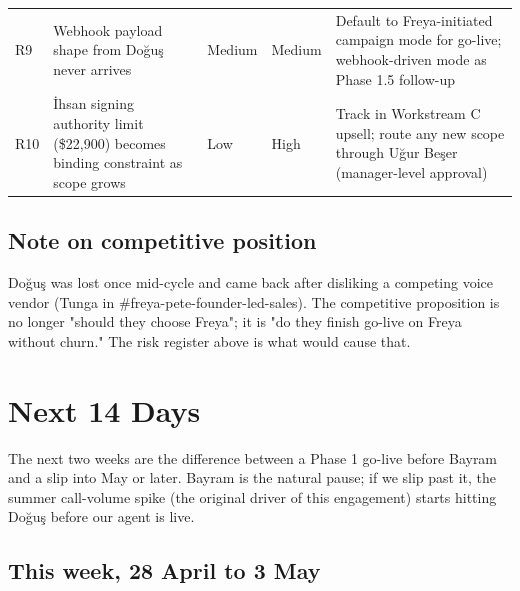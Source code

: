 \documentclass[10pt,a4paper]{article}
\begin{document}
\begin{tabularx}{\linewidth}{@{}L{0.5cm}L{4.6cm}L{1.4cm}L{1.4cm}X@{}}
R9 & Webhook payload shape from Doğuş never arrives           & Medium & Medium & Default to Freya-initiated campaign mode for go-live; webhook-driven mode as Phase 1.5 follow-up \\
R10 & İhsan signing authority limit (\$22{,}900) becomes binding constraint as scope grows & Low & High & Track in Workstream C upsell; route any new scope through Uğur Beşer (manager-level approval) \\
\bottomrule
\end{tabularx}

\subsection{Note on competitive position}

Doğuş was lost once mid-cycle and came back after disliking a competing voice vendor (Tunga in \#freya-pete-founder-led-sales). The competitive proposition is no longer "should they choose Freya"; it is "do they finish go-live on Freya without churn." The risk register above is what would cause that.

\newpage

\section{Next 14 Days}

The next two weeks are the difference between a Phase 1 go-live before Bayram and a slip into May or later. Bayram is the natural pause; if we slip past it, the summer call-volume spike (the original driver of this engagement) starts hitting Doğuş before our agent is live.

\subsection{This week, 28 April to 3 May}
\end{document}
